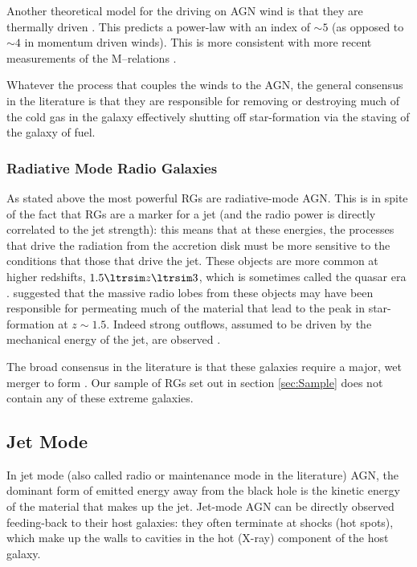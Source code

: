			Another theoretical model for the driving on AGN wind is that they are thermally driven \citep{Silk1998}. This predicts a power-law with an index of $\sim 5$ (as opposed to $\sim 4$ in momentum driven winds). This is more consistent with more recent measurements of the M--\textsigma relations \citep{McConnell2013}. 

			Whatever the process that couples the winds to the AGN, the general consensus in the literature is that they are responsible for removing or destroying much of the cold gas in the galaxy effectively shutting off star-formation via the staving of the galaxy of fuel. 

		\subsubsection{Radiative Mode Radio Galaxies}
			\label{subsubsec:RadiativeRadio}
			As stated above the most powerful RGs are radiative-mode AGN. This is in spite of the fact that RGs are a marker for a jet (and the radio power is directly correlated to the jet strength): this means that at these energies, the processes that drive the radiation from the accretion disk must be more sensitive to the conditions that those that drive the jet. These objects are more common at higher redshifts, $1.5 \ltrsim z \ltrsim 3$, which is sometimes called the quasar era \citep{Miley2008}. \citet{Gopal-Krishna2001} suggested that the massive radio lobes from these objects may have been responsible for permeating much of the material that lead to the peak in star-formation at $z \sim 1.5$. Indeed strong outflows, assumed to be driven by the mechanical energy of the jet, are observed \citep{Nesvadba2008, Maiolino2012}.

			The broad consensus in the literature is that these galaxies require a major, wet merger to form \citep{Malin1983, Quillen1992, Lim2000}. Our sample of RGs set out in section \ref{sec:Sample} does not contain any of these extreme galaxies.

	\subsection{Jet Mode}
		\label{subsec:Jet}
		In jet mode (also called radio or maintenance mode in the literature) AGN, the dominant form of emitted energy away from the black hole is the kinetic energy of the material that makes up the jet. Jet-mode AGN can be directly observed feeding-back to their host galaxies: they often terminate at shocks (hot spots), which make up the walls to cavities in the hot (X-ray) component of the host galaxy.

